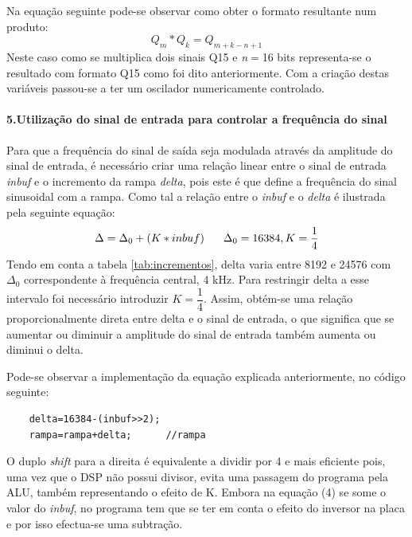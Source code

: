 \documentclass[11pt]{article}
\numberwithin{equation}{section}
\begin{document}
Na equação seguinte pode-se observar como obter o formato resultante num produto:
\begin{equation}
Q_{m} * Q_{k}=Q_{m+k-n+1}
\end{equation}
Neste caso como se multiplica dois sinais Q15 e \textit{n}$=$16 bits representa-se o resultado com formato Q15 como foi dito anteriormente.
Com a criação destas variáveis passou-se a ter um oscilador numericamente controlado.

\paragraph{5.Utilização do sinal de entrada para controlar a frequência do sinal} \hspace{0pt}

Para que a frequência do sinal de saída seja modulada através da amplitude do sinal de entrada, é necessário criar uma relação linear entre o sinal de entrada \textit{inbuf} e o incremento da rampa \textit{delta}, pois este é que define a frequência do sinal sinusoidal com a rampa. Como tal a relação entre o \textit{inbuf} e o \textit{delta} é ilustrada pela seguinte equação:
\begin{equation}
	\Delta=\Delta_0+(K*inbuf)	\hspace{6 mm}\Delta_0=16384, K=\frac{1}{4}
	\label{delta}
\end{equation}
Tendo em conta a tabela \ref{tab:incrementos}, delta varia entre 8192 e 24576 com $\Delta_0$ correspondente à frequência central, 4 kHz. Para restringir delta a esse intervalo foi necessário introduzir $K=\dfrac{1}{4}$. Assim, obtém-se uma relação proporcionalmente direta entre delta e o sinal de entrada, o que significa que se aumentar ou diminuir a amplitude do sinal de entrada também aumenta ou diminui o delta.

Pode-se observar a implementação da equação explicada anteriormente, no código seguinte:

\begin{lstlisting}
	delta=16384-(inbuf>>2); 
	rampa=rampa+delta;		//rampa
\end{lstlisting}
O duplo \textit{shift} para a direita é equivalente a dividir por 4 e mais eficiente pois, uma vez que o DSP não possui divisor, evita uma passagem do programa pela ALU, também representando o efeito de K.
Embora na equação (4) se some o valor do \textit{inbuf}, no programa tem que se ter em conta o efeito do inversor na placa e por isso efectua-se uma subtração.
\end{document}
